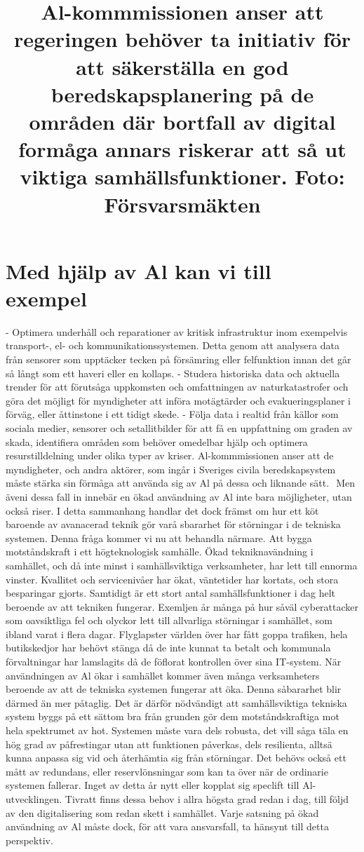 {{{{{{{{\title{
Al-kommmissionen anser att regeringen behöver ta initiativ för att säkerställa en god beredskapsplanering på de områden där bortfall av digital formåga annars riskerar att så ut viktiga samhällsfunktioner. Foto: Försvarsmäkten
}
\section*{Med hjälp av Al kan vi till exempel}
- Optimera underhåll och reparationer av kritisk infrastruktur inom exempelvis transport-, el- och kommunikationssystemen. Detta genom att analysera data från sensorer som upptäcker tecken på försämring eller felfunktion innan det går så långt som ett haveri eller en kollaps.
- Studera historiska data och aktuella trender för att förutsåga uppkomsten och omfattningen av naturkatastrofer och göra det möjligt för myndigheter att införa motägtärder och evakueringsplaner i förväg, eller åttinstone i ett tidigt skede.
- Följa data i realtid från källor som sociala medier, sensorer och setallitbilder för att få en uppfattning om graden av skada, identifiera områden som behöver omedelbar hjälp och optimera resurstilldelning under olika typer av kriser.
Al-kommmissionen anser att de myndigheter, och andra aktörer, som ingår i Sveriges civila beredskapsystem måste stärka sin förmåga att använda sig av Al på dessa och liknande sätt. \({ }^{}\) Men äveni dessa fall in innebär en ökad användning av Al inte bara möjligheter, utan också riser. I detta sammanhang handlar det dock främst om hur ett köt baroende av avanacerad teknik gör varå sbararhet för störningar i de tekniska systemen. Denna fråga kommer vi nu att behandla närmare.
Att bygga motståndskraft i ett högteknologisk samhälle.
Ökad tekniknavändning i samhället, och då inte minst i samhällsviktiga verksamheter, har lett till ennorma vinster. Kvallitet och servicenivåer har ökat, väntetider har kortats, och stora besparingar gjorts. Samtidigt är ett stort antal samhällsfunktioner i dag helt beroende av att tekniken fungerar. Exemljen år många på hur såväl cyberattacker som oavsiktliga fel och olyckor lett till allvarliga störningar i samhället, som ibland varat i flera dagar. Flyglapster världen över har fått goppa trafiken, hela butikskedjor har behövt stänga då de inte kunnat ta betalt och kommunala förvaltningar har lamslagits då de föflorat kontrollen över sina IT-system.
När användningen av Al ökar i samhället kommer även många verksamheters beroende av att de tekniska systemen fungerar att öka. Denna såbararhet blir därmed än mer påtaglig. Det är därför nödvändigt att samhällsviktiga tekniska system byggs på ett sättom bra från grunden gör dem motståndskraftiga mot hela spektrumet av hot. Systemen måste vara dels robusta, det vill såga täla en hög grad av påfrestingar utan att funktionen påverkas, dels resilienta, alltsä kunna anpassa sig vid och återhämtia sig från störningar. Det behövs också ett mått av redundans, eller reservlönsningar som kan ta över när de ordinarie systemen fallerar. Inget av detta år nytt eller kopplat sig speclift till Al-utvecklingen. Tivratt finns dessa behov i allra högsta grad redan i dag, till följd av den digitalisering som redan skett i samhället. Varje satsning på ökad användning av Al måste dock, för att vara ansvarsfall, ta hänsynt till detta perspektiv.
}}}}}}}}
